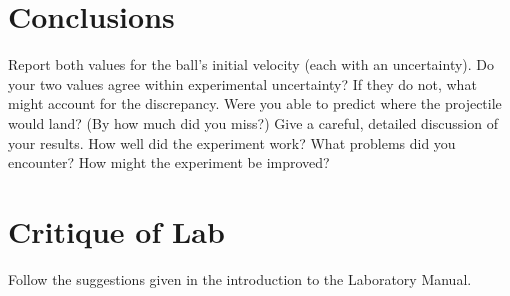 \ee

\section*{Conclusions}
Report both values for the ball's initial
velocity (each with an uncertainty).
Do your two values agree within experimental
uncertainty?  If they do not, what might account for the discrepancy.
Were you able to predict where the projectile would land? (By how much
did you miss?)
Give a careful, detailed discussion of
your results.  How well did the experiment work?  What problems did you encounter?
How might the experiment be improved?


\section*{Critique of Lab}

Follow the suggestions given in the introduction to the Laboratory
Manual.




